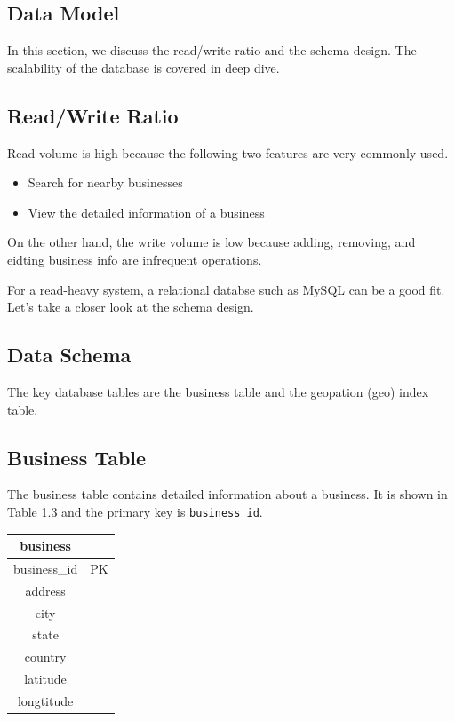 \documentclass{report}
\theoremstyle{definition}
\let\oldsubsection\subsection
\renewcommand{\subsection}{\oldsubsection*}
\begin{document}
\subsection{Data Model}

In this section, we discuss the read/write ratio and the schema design. The scalability of the database is covered in deep dive.

\subsection{Read/Write Ratio}

Read volume is high because the following two features are very commonly used.

\begin{itemize}
\item
Search for nearby businesses
\item
View the detailed information of a business
\end{itemize}

On the other hand, the write volume is low because adding, removing, and eidting business info are infrequent operations.

For a read-heavy system, a relational databse such as MySQL can be a good fit. Let's take a closer look at the schema design.

\subsection{Data Schema}

The key database tables are the business table and the geopation (geo) index table.

\subsection{Business Table}

The business table contains detailed information about a business. It is shown in Table 1.3 and the primary key is \lstinline|business_id|.

\begin{table}[H]
\centering
\begin{tabular}{|c c|}
\hline
\textbf{business} & \\
\hline
business\_id & PK \\
\hline
address & \\
\hline
city & \\
\hline
state & \\
\hline
country & \\
\hline
latitude & \\
\hline
longtitude & \\
\hline
\end{tabular}
\end{table}
\end{document}
